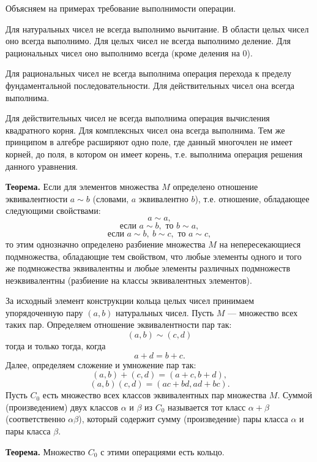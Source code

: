 \begin{rusblock}
Объясняем на примерах требование выполнимости операции.

Для натуральных чисел не всегда выполнимо вычитание. В области целых чисел оно всегда выполнимо. Для целых чисел не всегда выполнимо деление. Для рациональных чисел оно выполнимо всегда (кроме деления на $0$).

Для рациональных чисел не всегда выполнима операция перехода к пределу фундаментальной последовательности. Для действительных чисел она всегда выполнима.

Для действительных чисел не всегда выполнима операция вычисления квадратного корня. Для комплексных чисел она всегда выполнима. Тем же принципом в алгебре расширяют одно поле, где данный многочлен не имеет корней, до поля, в котором он имеет корень, т.е. выполнима операция решения данного уравнения.
\end{rusblock}

\begin{rusblock}
\textbf{Теорема.} Если для элементов множества $M$ определено отношение эквивалентности $a\sim b$ (словами, $a$ эквивалентно $b$), т.е. отношение, обладающее следующими свойствами:
\[
a\sim a,
\]
\[
\text{если }a\sim b,\text{ то }b\sim a,
\]
\[
\text{если }a\sim b,\ b\sim c,\text{ то }a\sim c,
\]
то этим однозначно определено разбиение множества $M$ на непересекающиеся подмножества, обладающие тем свойством, что любые элементы одного и того же подмножества эквивалентны и любые элементы различных подмножеств неэквивалентны (разбиение на классы эквивалентных элементов).
\end{rusblock}

\begin{rusblock}
За исходный элемент конструкции кольца целых чисел принимаем упорядоченную пару $(a,b)$ натуральных чисел. Пусть $M$ --- множество всех таких пар. Определяем отношение эквивалентности пар так:
\[
(a,b)\sim(c,d)
\]
тогда и только тогда, когда
\[
a+d=b+c.
\]
Далее, определяем сложение и умножение пар так:
\[
(a,b)+(c,d)=(a+c,b+d),
\]
\[
(a,b)(c,d)=(ac+bd,ad+bc).
\]
Пусть $C_0$ есть множество всех классов эквивалентных пар множества $M$. Суммой (произведением) двух классов $\alpha$ и $\beta$ из $C_0$ называется тот класс $\alpha+\beta$ (соответственно $\alpha\beta$), который содержит сумму (произведение) пары класса $\alpha$ и пары класса $\beta$.

\textbf{Теорема.} Множество $C_0$ с этими операциями есть кольцо.
\end{rusblock}

